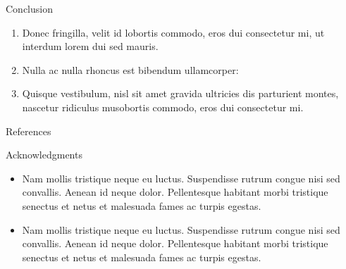 
\begin{block}{Conclusion}
	\begin{enumerate}
		\item Donec fringilla, velit id lobortis commodo, eros dui consectetur mi, ut interdum lorem dui sed mauris.
		\item Nulla ac nulla rhoncus est bibendum ullamcorper:
		\item Quisque vestibulum, nisl sit amet gravida ultricies dis parturient montes, nascetur ridiculus musobortis commodo, eros dui consectetur mi.
	\end{enumerate}
\end{block}


\begin{block}{References}
	\printbibliography
\end{block}


\begin{block}{Acknowledgments}
	
	\begin{itemize}
		\item Nam mollis tristique neque eu luctus. Suspendisse rutrum congue nisi sed convallis. Aenean id neque dolor. Pellentesque habitant morbi tristique senectus et netus et malesuada fames ac turpis egestas.
		\item Nam mollis tristique neque eu luctus. Suspendisse rutrum congue nisi sed convallis. Aenean id neque dolor. Pellentesque habitant morbi tristique senectus et netus et malesuada fames ac turpis egestas.
	\end{itemize}
	
\end{block}
